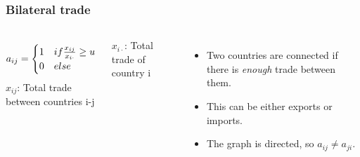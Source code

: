 \documentclass[professionalfont,fleqn]{beamer}
\begin{document}
		\begin{frame}
		\frametitle{Bilateral trade}
		
		\begin{columns}[t]
			
				\begin{equation*}
				a_{ij} = 
				\begin{cases} 
				1 & if \frac{x_{ij}}{x_{i\cdot}}\geq u \\
				0 & else 
				\end{cases}
				$$
				\end{equation*}
				$x_{ij}$: Total trade between countries i-j \par
				$x_{i\cdot}$: Total trade of country i
			
			
			\begin{itemize}
				\item Two countries are connected if there is \textit{enough} trade between them.
				\item This can be either exports or imports.
				\item The graph is directed, so $a_{ij} \neq a_{ji}$.
			\end{itemize}
			
		\end{columns}
		
		\end{frame}
		
				
		
\end{document}
